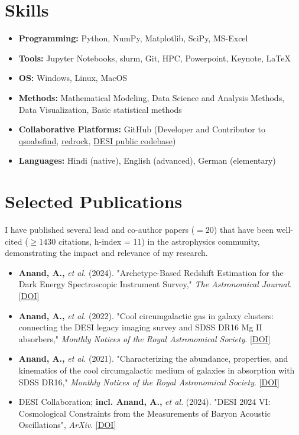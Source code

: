 \documentclass[a4paper,11pt]{article}
\begin{document}
\section*{Skills}
\begin{itemize}[noitemsep, topsep=0pt]
    \item \textbf{Programming:} Python, NumPy, Matplotlib, SciPy, MS-Excel
    \item \textbf{Tools:} Jupyter Notebooks, slurm, Git, HPC, Powerpoint, Keynote, LaTeX
    \item \textbf{OS:} Windows, Linux, MacOS
    \item \textbf{Methods:} Mathematical Modeling, Data Science and Analysis Methods, Data Visualization, Basic statistical methods
    \item \textbf{Collaborative Platforms:} GitHub (Developer and Contributor to \href{https://github.com/abhi0395/qsoabsfind}{qsoabsfind}, \href{https://github.com/desihub/redrock}{redrock}, \href{https://github.com/desihub}{DESI public codebase})
     \item \textbf{Languages:} Hindi (native), English (advanced), German (elementary)
\end{itemize}

\section*{Selected Publications}
I have published several lead and co-author papers ($= 20$) that have been well-cited ($\geq 1430$ citations, h-index = 11) in the astrophysics community, demonstrating the impact and relevance of my research.
\begin{itemize}[noitemsep, topsep=0pt]
    \item \textbf{Anand, A.,} \textit{et al.} (2024). "Archetype-Based Redshift Estimation for the Dark Energy Spectroscopic Instrument Survey," \textit{The Astronomical Journal}. \href{https://iopscience.iop.org/article/10.3847/1538-3881/ad60c2}{[DOI]}
    \item \textbf{Anand, A.,} \textit{et al.} (2022). "Cool circumgalactic gas in galaxy clusters: connecting the DESI legacy imaging survey and SDSS DR16 Mg II absorbers," \textit{Monthly Notices of the Royal Astronomical Society}. \href{https://doi.org/10.1093/mnras/stab871}{[DOI]}
    \item \textbf{Anand, A.,} \textit{et al.} (2021). "Characterizing the abundance, properties, and kinematics of the cool circumgalactic medium of galaxies in absorption with SDSS DR16," \textit{Monthly Notices of the Royal Astronomical Society}. \href{https://doi.org/10.1093/mnras/stac928}{[DOI]}
    \item DESI Collaboration; \textbf{incl. Anand, A.,} \textit{et al.} (2024). "DESI 2024 VI: Cosmological Constraints from the Measurements of Baryon Acoustic Oscillations", \textit{ArXiv}. \href{10.48550/arXiv.2404.03002}{[DOI]}
\end{itemize}
\end{document}
